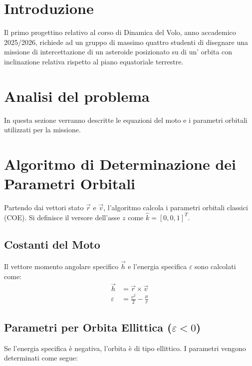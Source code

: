\documentclass[12pt, a4paper]{article}
\begin{document}
\newpage
\tableofcontents 
\newpage


\section{Introduzione}
Il primo progettino relativo al corso di Dinamica del Volo, anno accademico 2025/2026, richiede ad un gruppo di massimo quattro studenti di disegnare una missione di intercettazione di un asteroide posizionato su di un' orbita con inclinazione relativa rispetto al piano equatoriale terrestre.

\section{Analisi del problema}
In questa sezione verranno descritte le equazioni del moto e i parametri orbitali utilizzati per la missione.

\section{Algoritmo di Determinazione dei Parametri Orbitali}

Partendo dai vettori stato $\vec{r}$ e $\vec{v}$, l'algoritmo calcola i parametri orbitali classici (COE). Si definisce il versore dell'asse $z$ come $\hat{k} = [0, 0, 1]^T$.

\subsection{Costanti del Moto}
Il vettore momento angolare specifico $\vec{h}$ e l'energia specifica $\varepsilon$ sono calcolati come:
\begin{align}
    \vec{h} &= \vec{r} \times \vec{v} \\
    \varepsilon &= \frac{v^2}{2} - \frac{\mu}{r}
\end{align}

\subsection{Parametri per Orbita Ellittica ($\varepsilon < 0$)}
Se l'energia specifica è negativa, l'orbita è di tipo ellittico. I parametri vengono determinati come segue:
\end{document}
